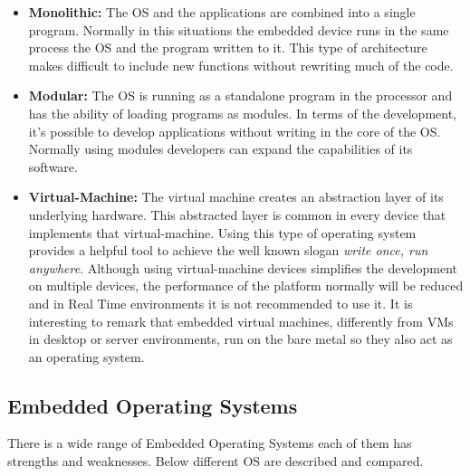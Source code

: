 \begin{itemize}
\item \textbf{Monolithic:} The OS and the applications are combined into a single program. Normally in this situations the embedded device runs in the same process the OS and the program written to it. This type of architecture makes difficult to include new functions without rewriting much of the code.

\item \textbf{Modular:} The OS is running as a standalone program in the processor and has the ability of loading programs as modules. In terms of the development, it's possible to develop applications without writing in the core of the OS. Normally using modules developers can expand the capabilities of its software.

\item \textbf{Virtual-Machine:} The virtual machine creates an abstraction layer of its underlying hardware. This abstracted layer is common in every device that implements that virtual-machine. Using this type of operating system provides a helpful tool to achieve the well known slogan \textit{write once, run anywhere}. Although using virtual-machine devices simplifies the development on multiple devices, the performance of the platform normally will be reduced and in Real Time environments it is not recommended to use it. It is interesting to remark that embedded virtual machines, differently from VMs in desktop or server environments, run on the bare metal so they also act as an operating system.
\end{itemize}

\subsection{Embedded Operating Systems}\label{SOTA-Embedded-Operating-Systems}
There is a wide range of Embedded Operating Systems each of them has strengths and weaknesses. Below different OS are described and compared.
 
